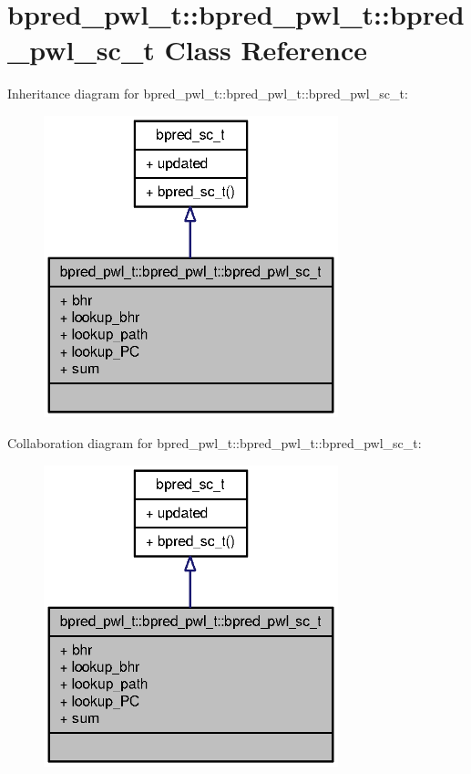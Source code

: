 \section{bpred\_\-pwl\_\-t::bpred\_\-pwl\_\-t::bpred\_\-pwl\_\-sc\_\-t Class Reference}
\label{classbpred__pwl__t_1_1bpred__pwl__sc__t}
Inheritance diagram for bpred\_\-pwl\_\-t::bpred\_\-pwl\_\-t::bpred\_\-pwl\_\-sc\_\-t:\nopagebreak
\begin{figure}[H]
\begin{center}
\leavevmode
\includegraphics[width=242pt]{classbpred__pwl__t_1_1bpred__pwl__sc__t__inherit__graph}
\end{center}
\end{figure}
Collaboration diagram for bpred\_\-pwl\_\-t::bpred\_\-pwl\_\-t::bpred\_\-pwl\_\-sc\_\-t:\nopagebreak
\begin{figure}[H]
\begin{center}
\leavevmode
\includegraphics[width=242pt]{classbpred__pwl__t_1_1bpred__pwl__sc__t__coll__graph}
\end{center}
\end{figure}
